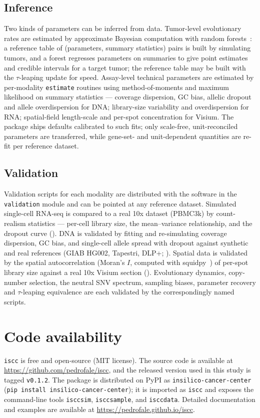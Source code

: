 \documentclass{article}
\begin{document}
\subsection{Inference}
\label{sec:inference_methods}
Two kinds of parameters can be inferred from data. Tumor-level evolutionary rates are estimated
by approximate Bayesian computation with random forests~\cite{raynal_abc_2019}: a reference table
of (parameters, summary statistics) pairs is built by simulating tumors, and a forest regresses
parameters on summaries to give point estimates and credible intervals for a target tumor; the
reference table may be built with the $\tau$-leaping update for speed. Assay-level technical
parameters are estimated by per-modality \texttt{estimate} routines using method-of-moments and
maximum likelihood on summary statistics --- coverage dispersion, GC bias, allelic dropout and
allele overdispersion for DNA; library-size variability and overdispersion for RNA; spatial-field
length-scale and per-spot concentration for Visium. The package ships defaults calibrated to such
fits; only scale-free, unit-reconciled parameters are transferred, while gene-set- and
unit-dependent quantities are re-fit per reference dataset.

\subsection{Validation}
\label{sec:validation}
Validation scripts for each modality are distributed with the software in the \texttt{validation}
module and can be pointed at any reference dataset. Simulated single-cell RNA-seq is compared to a
real 10x dataset (PBMC3k) by count-realism statistics --- per-cell library size, the mean--variance
relationship, and the dropout curve (). DNA is validated by fitting and
re-simulating coverage dispersion, GC bias, and single-cell allele spread with dropout against
synthetic and real references (GIAB HG002, Tapestri, DLP+; ). Spatial data
is validated by the spatial autocorrelation (Moran's $I$, computed with
squidpy~\cite{palla_squidpy_2022}) of per-spot library size against a real 10x Visium section
(). Evolutionary dynamics, copy-number selection,
the neutral SNV spectrum, sampling biases, parameter recovery and $\tau$-leaping equivalence are
each validated by the correspondingly named scripts.


\section*{Code availability}
\texttt{iscc} is free and open-source (MIT license). The source code is available at
\url{https://github.com/pedrofale/iscc}, and the released version used in this study is tagged
\texttt{v0.1.2}. The package is distributed on PyPI as \texttt{insilico-cancer-center}
(\texttt{pip install insilico-cancer-center}); it is imported as \texttt{iscc} and exposes the
command-line tools \texttt{isccsim}, \texttt{isccsample}, and \texttt{isccdata}. Detailed
documentation and examples are available at \url{https://pedrofale.github.io/iscc}.
\end{document}
